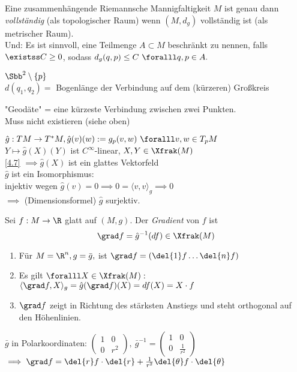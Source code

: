 \begin{cor*}
	Eine zusammenhängende Riemannsche Mannigfaltigkeit $M$ ist genau dann \emph{vollständig} (als topologischer Raum) wenn $(M,d_g)$ vollständig ist (als metrischer Raum).\\
	Und: Es ist sinnvoll, eine Teilmenge $ A \subset M $ beschränkt zu nennen, falls $ \existss C \geq 0 $, sodass $ d_g(q,p) \leq C \ \foralll q,p \in A. $
\end{cor*}

\begin{exmp*}
	$ \Sbb^2 \setminus \{p\} $\\
	$ d(q_1,q_2) = $ Bogenlänge der Verbindung auf dem (kürzeren) Großkreis
\end{exmp*}

\begin{rem*}
	"Geodäte" =  eine kürzeste Verbindung zwischen zwei Punkten.\\
	Muss nicht existieren (siehe oben)
\end{rem*}

\begin{rem}
	$ \hat{g}: TM \to T^*M, \hat{g}(v)(w) := g_p(v,w) \ \foralll v,w \in T_pM $\\
	$ Y \mapsto \hat{g}(X)(Y) $ ist $C^\infty$-linear, $X,Y \in \Xfrak(M)$\\
	\ref{4.7} $\implies \hat{g}(X)$ ist ein glattes Vektorfeld \checkmark \\
	$\hat{g}$ ist ein Isomorphismus:\\
	injektiv wegen $\hat{g}(v) = 0 \implies 0 = \langle v,v\rangle_g \implies 0$\\
	$\implies$ (Dimensionsformel) $\hat{g}$ surjektiv.
\end{rem}

\begin{defn*}[Gradient]
	Sei $f: M \to \R$ glatt auf $(M,g)$. Der \emph{Gradient} von $f$ ist
	\[ \grad f = \hat{g}^{-1}(df) \in \Xfrak(M) \]
\end{defn*}

\begin{rem*}
	\begin{enumerate}[label={\roman*})]
		\item Für $ M = \R^n, g = \bar{g}, $ ist $ \grad f = (\del{1}f \dots \del{n}f) $
		\item Es gilt $ \foralll X \in \Xfrak(M): $\\
			$ \langle \grad f, X \rangle_g = \hat{g} (\grad f)(X) = df(X) = X \cdot f $
		\item $\grad f$ zeigt in Richtung des stärksten Anstiegs und steht orthogonal auf den Höhenlinien.
	\end{enumerate}
\end{rem*}

\begin{exmp*}
	$\bar{g}$ in Polarkoordinaten: $ \begin{pmatrix}
		1&0\\0&r^2
	\end{pmatrix},\ \bar{g}^{-1} = \begin{pmatrix}
	1&0\\0&\frac{1}{r^2}
	\end{pmatrix} $\\
	$ \implies \grad f  = \del{r}f \cdot \del{r} + \frac{1}{r^2} \del{\theta}f \cdot \del{\theta} $
\end{exmp*}
